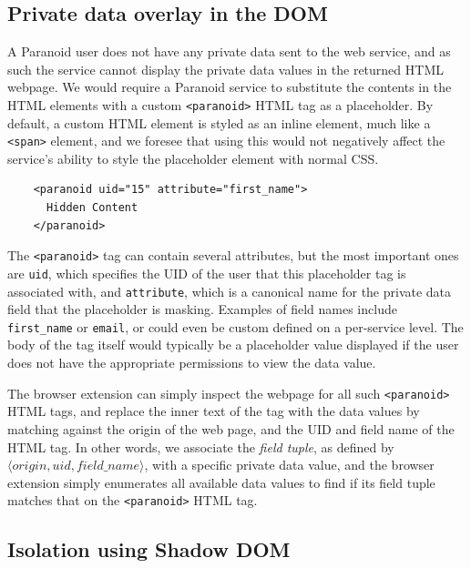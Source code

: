 \documentclass[letterpaper,twocolumn,10pt]{article}
\begin{document}
\subsection{Private data overlay in the DOM}

A Paranoid user does not have any private data sent to the web service, and as such the service cannot display the private data values in the returned HTML webpage. We would require a Paranoid service to substitute the contents in the HTML elements with a custom \texttt{<paranoid>} HTML tag as a placeholder. By default, a custom HTML element is styled as an inline element, much like a \texttt{<span>} element, and we foresee that using this would not negatively affect the service's ability to style the placeholder element with normal CSS.

\begin{center}
    \begin{lstlisting}
    <paranoid uid="15" attribute="first_name">
      Hidden Content
    </paranoid>
    \end{lstlisting}
    \label{fig:paranoid_tag}
\end{center}

The \texttt{<paranoid>} tag can contain several attributes, but the most important ones are \texttt{uid}, which specifies the UID of the user that this placeholder tag is associated with, and \texttt{attribute}, which is a canonical name for the private data field that the placeholder is masking. Examples of field names include \texttt{first\_name} or \texttt{email}, or could even be custom defined on a per-service level. The body of the tag itself would typically be a placeholder value displayed if the user does not have the appropriate permissions to view the data value.

The browser extension can simply inspect the webpage for all such \texttt{<paranoid>} HTML tags, and replace the inner text of the tag with the data values by matching against the origin of the web page, and the UID and field name of the HTML tag. In other words, we associate the \textit{field tuple}, as defined by $\langle origin, uid, field\_name \rangle$, with a specific private data value, and the browser extension simply enumerates all available data values to find if its field tuple matches that on the \texttt{<paranoid>} HTML tag.

\subsection{Isolation using Shadow DOM}\label{sec:shadow_dom}
\end{document}
